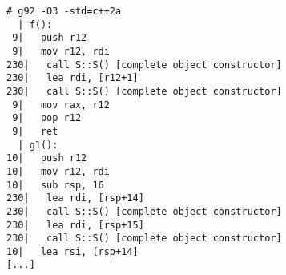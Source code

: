 \begin{lstlisting}[language={},numbers=none,title=\href{https://godbolt.org/z/v5ro3q}{\texttt{godbolt.org/z/v5ro3q}}]
# g92 -O3 -std=c++2a
  | f():
 9|   push r12
 9|   mov r12, rdi
230|   call S::S() [complete object constructor]
230|   lea rdi, [r12+1]
230|   call S::S() [complete object constructor]
 9|   mov rax, r12
 9|   pop r12
 9|   ret
  | g1():
10|   push r12
10|   mov r12, rdi
10|   sub rsp, 16
230|   lea rdi, [rsp+14]
230|   call S::S() [complete object constructor]
230|   lea rdi, [rsp+15]
230|   call S::S() [complete object constructor]
10|   lea rsi, [rsp+14]
[...]
\end{lstlisting}
